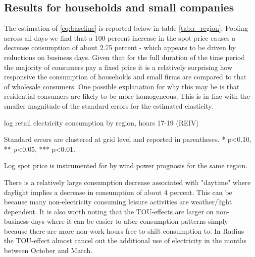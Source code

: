 \subsection{Results for households and small companies}
The estimation of \eqref{eq:baseline} is reported below in table \ref{tab:r_region}. Pooling across all days we find that a 100 percent increase in the spot price causes a decrease consumption of about 2.75 percent - which appears to be driven by reductions on business days. Given that for the full duration of the time period the majority of consumers pay a fixed price it is a relatively surprising how responsive the consumption of households and small firms are compared to that of wholesale consumers. One possible explanation for why this may be is that residential consumers are likely to be more homogeneous. This is in line with the smaller magnitude of the standard errors for the estimated elasticity.
\label{subsec:r_households}
\begin{table}[H]
\begin{threeparttable}
  \centering
  \caption{log retail electricity consumption by region, hours 17-19 (REIV)}
  \label{tab:r_region}
  \footnotesize
    
    \begin{tablenotes}
    \item Standard errors are clustered at grid level and reported in parentheses. * p<0.10, ** p<0.05, *** p<0.01.
    \item Log spot price is instrumented for by wind power prognosis for the same region.
  \end{tablenotes}
\end{threeparttable}
\end{table}
There is a relatively large consumption decrease associated with "daytime" where daylight implies a decrease in consumption of about 4 percent. This can be because many non-electricity consuming leisure activities are weather/light dependent. It is also worth noting that the TOU-effects are larger on non-business days where it can be easier to alter consumption patterns simply because there are more non-work hours free to shift consumption to. In Radius the TOU-effect almost cancel out the additional use of electricity in the months between October and March.  

